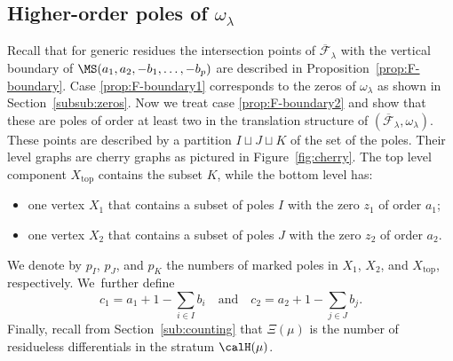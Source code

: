\subsection{Higher-order poles of $\omega_{\lambda}$}\label{subsub:HigherPoles}

Recall that for generic residues the intersection points of $\overline{\mathcal{F}}_{\lambda}$ with the vertical boundary of $\MS(a_{1},a_{2},-b_{1},\dots,-b_{p})$ are described in Proposition~\ref{prop:F-boundary}. Case \eqref{prop:F-boundary1} corresponds to the zeros of $\omega_{\lambda}$ as shown in Section~\ref{subsub:zeros}. Now we treat case \eqref{prop:F-boundary2} and show that these are poles of order at least two in the translation structure of $(\overline{\mathcal{F}}_{\lambda},\omega_{\lambda})$. These points are described by a partition $I \sqcup J \sqcup K$ of the set of the poles. Their level graphs are cherry graphs as pictured in Figure~\ref{fig:cherry}. The top level component $X_\mathrm{top}$ contains the subset $K$, while the bottom level has:
\begin{itemize}
\item one vertex $X_{1}$ that contains a subset of poles $I$ with the zero $z_1$ of order $a_{1}$;
\item one vertex $X_{2}$ that contains a subset of poles $J$ with the zero $z_{2}$ of order $a_{2}$.
\end{itemize}
We denote by $p_{I}$, $p_{J}$, and $p_{K}$ the numbers of marked poles in $X_{1}$, $X_{2}$, and $X_\mathrm{top}$, respectively. We~further define
\begin{equation}\label{eq:prongs}
c_{1}=a_{1}+1-\sum_{i \in I} b_{i} \quad \text{and} \quad c_{2}=a_{2}+1-\sum_{j \in J} b_{j}.
\end{equation}
Finally, recall from Section~\ref{sub:counting} that $\Xi(\mu)$ is the number of residueless differentials in the stratum $\calH(\mu)$.

